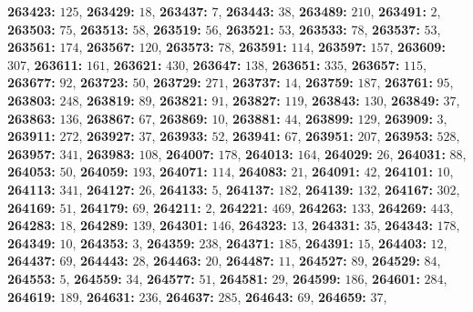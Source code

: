 \textsf{\bfseries 263423:} $125$, \textsf{\bfseries 263429:} $18$, \textsf{\bfseries 263437:} $7$, \textsf{\bfseries 263443:} $38$, \textsf{\bfseries 263489:} $210$, \textsf{\bfseries 263491:} $2$, \textsf{\bfseries 263503:} $75$, \textsf{\bfseries 263513:} $58$, \textsf{\bfseries 263519:} $56$, \textsf{\bfseries 263521:} $53$, \textsf{\bfseries 263533:} $78$, \textsf{\bfseries 263537:} $53$, \textsf{\bfseries 263561:} $174$, \textsf{\bfseries 263567:} $120$, \textsf{\bfseries 263573:} $78$, \textsf{\bfseries 263591:} $114$, \textsf{\bfseries 263597:} $157$, \textsf{\bfseries 263609:} $307$, \textsf{\bfseries 263611:} $161$, \textsf{\bfseries 263621:} $430$, \textsf{\bfseries 263647:} $138$, \textsf{\bfseries 263651:} $335$, \textsf{\bfseries 263657:} $115$, \textsf{\bfseries 263677:} $92$, \textsf{\bfseries 263723:} $50$, \textsf{\bfseries 263729:} $271$, \textsf{\bfseries 263737:} $14$, \textsf{\bfseries 263759:} $187$, \textsf{\bfseries 263761:} $95$, \textsf{\bfseries 263803:} $248$, \textsf{\bfseries 263819:} $89$, \textsf{\bfseries 263821:} $91$, \textsf{\bfseries 263827:} $119$, \textsf{\bfseries 263843:} $130$, \textsf{\bfseries 263849:} $37$, \textsf{\bfseries 263863:} $136$, \textsf{\bfseries 263867:} $67$, \textsf{\bfseries 263869:} $10$, \textsf{\bfseries 263881:} $44$, \textsf{\bfseries 263899:} $129$, \textsf{\bfseries 263909:} $3$, \textsf{\bfseries 263911:} $272$, \textsf{\bfseries 263927:} $37$, \textsf{\bfseries 263933:} $52$, \textsf{\bfseries 263941:} $67$, \textsf{\bfseries 263951:} $207$, \textsf{\bfseries 263953:} $528$, \textsf{\bfseries 263957:} $341$, \textsf{\bfseries 263983:} $108$, \textsf{\bfseries 264007:} $178$, \textsf{\bfseries 264013:} $164$, \textsf{\bfseries 264029:} $26$, \textsf{\bfseries 264031:} $88$, \textsf{\bfseries 264053:} $50$, \textsf{\bfseries 264059:} $193$, \textsf{\bfseries 264071:} $114$, \textsf{\bfseries 264083:} $21$, \textsf{\bfseries 264091:} $42$, \textsf{\bfseries 264101:} $10$, \textsf{\bfseries 264113:} $341$, \textsf{\bfseries 264127:} $26$, \textsf{\bfseries 264133:} $5$, \textsf{\bfseries 264137:} $182$, \textsf{\bfseries 264139:} $132$, \textsf{\bfseries 264167:} $302$, \textsf{\bfseries 264169:} $51$, \textsf{\bfseries 264179:} $69$, \textsf{\bfseries 264211:} $2$, \textsf{\bfseries 264221:} $469$, \textsf{\bfseries 264263:} $133$, \textsf{\bfseries 264269:} $443$, \textsf{\bfseries 264283:} $18$, \textsf{\bfseries 264289:} $139$, \textsf{\bfseries 264301:} $146$, \textsf{\bfseries 264323:} $13$, \textsf{\bfseries 264331:} $35$, \textsf{\bfseries 264343:} $178$, \textsf{\bfseries 264349:} $10$, \textsf{\bfseries 264353:} $3$, \textsf{\bfseries 264359:} $238$, \textsf{\bfseries 264371:} $185$, \textsf{\bfseries 264391:} $15$, \textsf{\bfseries 264403:} $12$, \textsf{\bfseries 264437:} $69$, \textsf{\bfseries 264443:} $28$, \textsf{\bfseries 264463:} $20$, \textsf{\bfseries 264487:} $11$, \textsf{\bfseries 264527:} $89$, \textsf{\bfseries 264529:} $84$, \textsf{\bfseries 264553:} $5$, \textsf{\bfseries 264559:} $34$, \textsf{\bfseries 264577:} $51$, \textsf{\bfseries 264581:} $29$, \textsf{\bfseries 264599:} $186$, \textsf{\bfseries 264601:} $284$, \textsf{\bfseries 264619:} $189$, \textsf{\bfseries 264631:} $236$, \textsf{\bfseries 264637:} $285$, \textsf{\bfseries 264643:} $69$, \textsf{\bfseries 264659:} $37$, 
